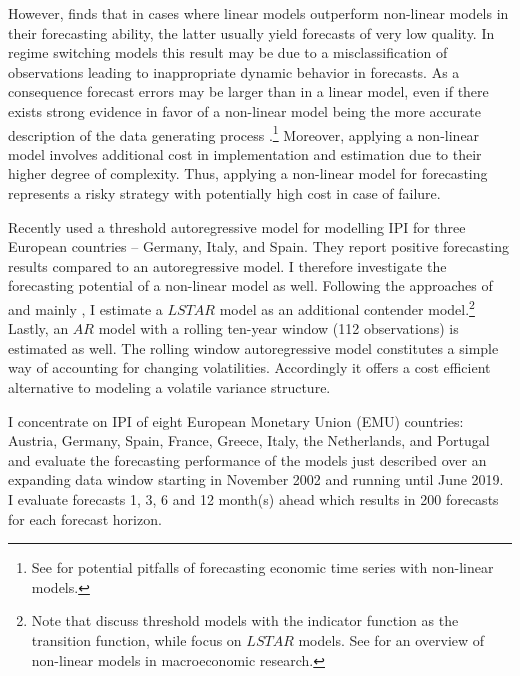 \documentclass[12pt,letterpaper,fleqn]{article}           %
\begin{document}
However, \textcite{marc04} finds that in cases where linear models outperform non-linear models in their forecasting ability, the latter usually yield forecasts of very low quality. In regime switching models this result may be due to a misclassification of observations leading to inappropriate dynamic behavior in forecasts. As a consequence forecast errors may be larger than in a linear model, even if there exists strong evidence in favor of a non-linear model being the more accurate description of the data generating process \parencite{dacco99}.\footnote{See \textcite{ter06} for potential pitfalls of forecasting economic time series with non-linear models.}  %
Moreover, applying a non-linear model involves additional cost in implementation and estimation due to their higher degree of complexity. Thus, applying a non-linear model for forecasting represents a risky strategy with potentially high cost in case of failure. %

Recently \textcite{avd18} used a threshold autoregressive model for modelling IPI for three European countries -- Germany, Italy, and Spain. They report positive forecasting results compared to an autoregressive model. I therefore investigate the forecasting potential of a non-linear model as well. Following the approaches of \textcite{chen95} and mainly \textcite{lopes06}, I estimate a $LSTAR$ model as an additional contender model.\footnote{Note that \textcite{chen95} discuss threshold models with the indicator function as the transition function, while \textcite{lopes06} focus on $LSTAR$ models. See \textcite{hubrich13} for an overview of non-linear models in macroeconomic research.} Lastly, an $AR$ model with a rolling ten-year window (112 observations) is estimated as well. The rolling window autoregressive model constitutes a simple way of accounting for changing volatilities. Accordingly it offers a cost efficient alternative to modeling a volatile variance structure.

I concentrate on IPI of eight European Monetary Union (EMU) countries: Austria, Germany, Spain, France, Greece, Italy, the Netherlands, and Portugal and evaluate the forecasting performance of the models just described over an expanding data window starting in November 2002 and running until June 2019. I evaluate forecasts 1, 3, 6 and 12 month(s) ahead which results in 200 forecasts for each forecast horizon. 
\end{document}
